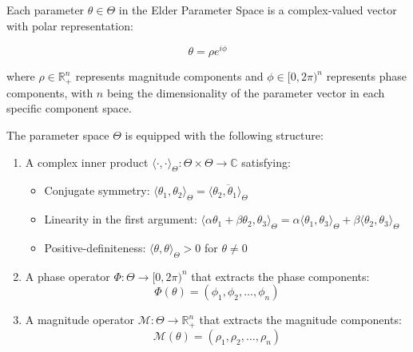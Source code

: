 \begin{definition}
Each parameter $\theta \in \Theta$ in the Elder Parameter Space is a complex-valued vector with polar representation:

\begin{equation}
\theta = \rho e^{i\phi}
\end{equation}

where $\rho \in \mathbb{R}^n_+$ represents magnitude components and $\phi \in [0, 2\pi)^n$ represents phase components, with $n$ being the dimensionality of the parameter vector in each specific component space.

The parameter space $\Theta$ is equipped with the following structure:
\begin{enumerate}
    \item A complex inner product $\langle \cdot, \cdot \rangle_{\Theta}: \Theta \times \Theta \rightarrow \mathbb{C}$ satisfying:
    \begin{itemize}
        \item Conjugate symmetry: $\langle \theta_1, \theta_2 \rangle_{\Theta} = \overline{\langle \theta_2, \theta_1 \rangle_{\Theta}}$
        \item Linearity in the first argument: $\langle \alpha\theta_1 + \beta\theta_2, \theta_3 \rangle_{\Theta} = \alpha\langle \theta_1, \theta_3 \rangle_{\Theta} + \beta\langle \theta_2, \theta_3 \rangle_{\Theta}$
        \item Positive-definiteness: $\langle \theta, \theta \rangle_{\Theta} > 0$ for $\theta \neq 0$
    \end{itemize}
    
    \item A phase operator $\Phi: \Theta \rightarrow [0, 2\pi)^n$ that extracts the phase components:
    \begin{equation}
    \Phi(\theta) = (\phi_1, \phi_2, \ldots, \phi_n)
    \end{equation}
    
    \item A magnitude operator $\mathcal{M}: \Theta \rightarrow \mathbb{R}^n_+$ that extracts the magnitude components:
    \begin{equation}
    \mathcal{M}(\theta) = (\rho_1, \rho_2, \ldots, \rho_n)
    \end{equation}
\end{enumerate}
\end{definition}

